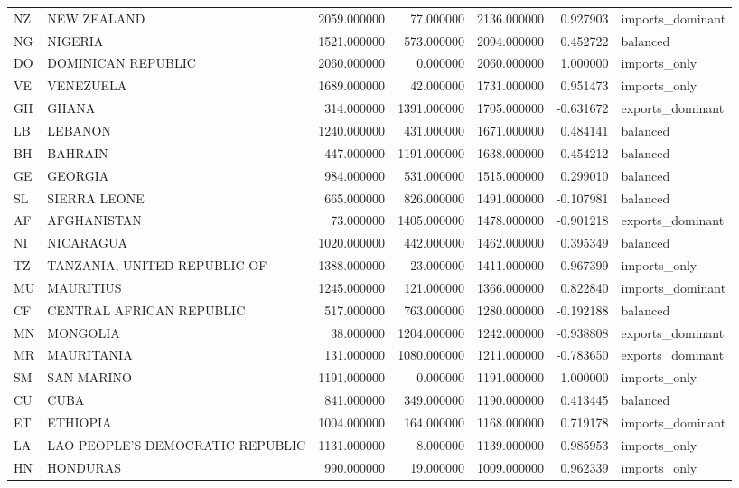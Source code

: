 \begin{tabular}{llrrrrl}
NZ & NEW ZEALAND & 2059.000000 & 77.000000 & 2136.000000 & 0.927903 & imports\_dominant \\
NG & NIGERIA & 1521.000000 & 573.000000 & 2094.000000 & 0.452722 & balanced \\
DO & DOMINICAN REPUBLIC & 2060.000000 & 0.000000 & 2060.000000 & 1.000000 & imports\_only \\
VE & VENEZUELA & 1689.000000 & 42.000000 & 1731.000000 & 0.951473 & imports\_only \\
GH & GHANA & 314.000000 & 1391.000000 & 1705.000000 & -0.631672 & exports\_dominant \\
LB & LEBANON & 1240.000000 & 431.000000 & 1671.000000 & 0.484141 & balanced \\
BH & BAHRAIN & 447.000000 & 1191.000000 & 1638.000000 & -0.454212 & balanced \\
GE & GEORGIA & 984.000000 & 531.000000 & 1515.000000 & 0.299010 & balanced \\
SL & SIERRA LEONE & 665.000000 & 826.000000 & 1491.000000 & -0.107981 & balanced \\
AF & AFGHANISTAN & 73.000000 & 1405.000000 & 1478.000000 & -0.901218 & exports\_dominant \\
NI & NICARAGUA & 1020.000000 & 442.000000 & 1462.000000 & 0.395349 & balanced \\
TZ & TANZANIA, UNITED REPUBLIC OF & 1388.000000 & 23.000000 & 1411.000000 & 0.967399 & imports\_only \\
MU & MAURITIUS & 1245.000000 & 121.000000 & 1366.000000 & 0.822840 & imports\_dominant \\
CF & CENTRAL AFRICAN REPUBLIC & 517.000000 & 763.000000 & 1280.000000 & -0.192188 & balanced \\
MN & MONGOLIA & 38.000000 & 1204.000000 & 1242.000000 & -0.938808 & exports\_dominant \\
MR & MAURITANIA & 131.000000 & 1080.000000 & 1211.000000 & -0.783650 & exports\_dominant \\
SM & SAN MARINO & 1191.000000 & 0.000000 & 1191.000000 & 1.000000 & imports\_only \\
CU & CUBA & 841.000000 & 349.000000 & 1190.000000 & 0.413445 & balanced \\
ET & ETHIOPIA & 1004.000000 & 164.000000 & 1168.000000 & 0.719178 & imports\_dominant \\
LA & LAO PEOPLE'S DEMOCRATIC REPUBLIC & 1131.000000 & 8.000000 & 1139.000000 & 0.985953 & imports\_only \\
HN & HONDURAS & 990.000000 & 19.000000 & 1009.000000 & 0.962339 & imports\_only \\

\end{tabular}
